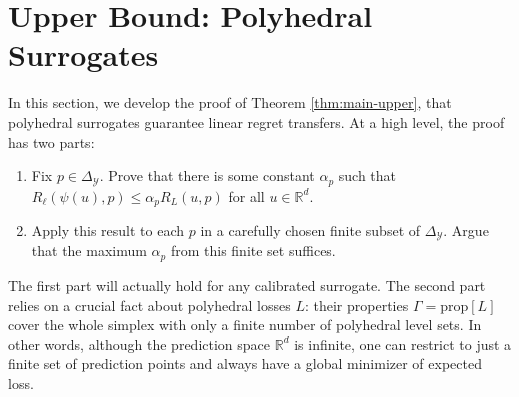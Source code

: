 \documentclass{article}
\theoremstyle{definition}\newtheorem{definition}{Definition}
\theoremstyle{definition}\newtheorem{assumption}{Assumption}
\newcommand{\reals}{\mathbb{R}}
\newcommand{\prop}[1]{\mathrm{prop}[#1]}
\newcommand{\simplex}{\Delta_\Y}
\newcommand{\Y}{\mathcal{Y}}
\begin{document}
\section{Upper Bound: Polyhedral Surrogates} \label{sec:upper}
In this section, we develop the proof of Theorem \ref{thm:main-upper}, that polyhedral surrogates guarantee linear regret transfers.
At a high level, the proof has two parts:
\begin{enumerate}
  \item Fix $p \in \simplex$.
        Prove that there is some constant $\alpha_p$ such that $R_{\ell}(\psi(u),p) \leq \alpha_p R_L(u,p)$ for all $u\in\reals^d$.
      \item Apply this result to each $p$ in a carefully chosen finite subset of $\simplex$.
        Argue that the maximum $\alpha_p$ from this finite set suffices.
\end{enumerate}
The first part will actually hold for any calibrated surrogate.
The second part relies on a crucial fact about polyhedral losses $L$: their properties $\Gamma=\prop{L}$ cover the whole simplex with only a finite number of polyhedral level sets.
In other words, although the prediction space $\reals^d$ is infinite, one can restrict to just a finite set of prediction points and always have a global minimizer of expected loss.
\end{document}
